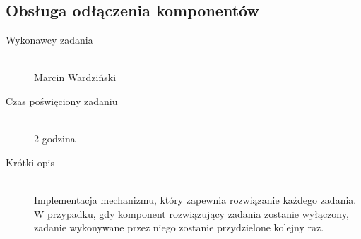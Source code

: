 \documentclass[a4paper]{article}
\begin{document}
\subsection{Obsługa odłączenia komponentów}
\begin{description}
    \item[Wykonawcy zadania] \hfill \\ Marcin Wardziński
    \item[Czas poświęciony zadaniu] \hfill \\ 2 godzina
    \item[Krótki opis] \hfill \\ Implementacja mechanizmu, który zapewnia rozwiązanie każdego zadania. W przypadku, gdy komponent rozwiązujący zadania zostanie wyłączony, zadanie wykonywane przez niego zostanie przydzielone kolejny raz.
\end{description}      
   
\end{document}
